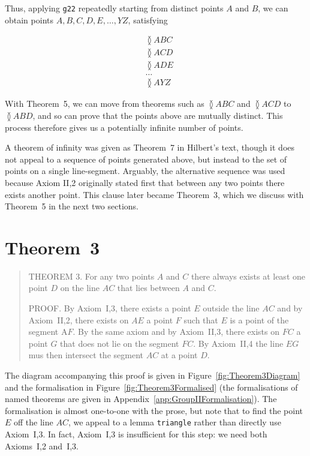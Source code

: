Thus, applying \texttt{g22} repeatedly starting from distinct points $A$ and $B$, we can obtain points $A, B, C, D, E, \ldots, Y Z$, satisfying 

\begin{align*}
&\between{A}{B}{C}\\
&\between{A}{C}{D}\\
&\between{A}{D}{E}\\
&\ldots\\
&\between{A}{Y}{Z}
\end{align*}

With Theorem~5, we can move from theorems such as $\between{A}{B}{C}$ and $\between{A}{C}{D}$ to $\between{A}{B}{D}$, and so can prove that the points above are mutually distinct. This process therefore gives us a potentially infinite number of points.

A theorem of infinity was given as Theorem~7 in Hilbert's text, though it does not appeal to a sequence of points generated above, but instead to the set of points on a single line-segment. Arguably, the alternative sequence was used because Axiom II,2 originally stated first that between any two points there exists another point. This clause later became Theorem~3, which we discuss with Theorem~5 in the next two sections.

\section{Theorem~3}\label{sec:Theorem3}
\begin{quote}
  THEOREM 3. For any two points $A$ and $C$ there always exists at least one point $D$ on the line $AC$ that lies between $A$ and $C$.

  PROOF. By Axiom~I,3, there exists a point $E$ outside the line $AC$ and by Axiom~II,2, there exists on $AE$ a point $F$ such that $E$ is a point of the segment A$F$. By the same axiom and by Axiom~II,3, there exists on $FC$ a point $G$ that does not lie on the segment $FC$. By Axiom~II,4 the line $EG$ mus then intersect the segment $AC$ at a point $D$.
\end{quote}

The diagram accompanying this proof is given in Figure~\ref{fig:Theorem3Diagram} and the formalisation in Figure~\ref{fig:Theorem3Formalised} (the formalisations of named theorems are given in Appendix~\ref{app:GroupIIFormalisation}). The formalisation is almost one-to-one with the prose, but note that to find the point $E$ off the line $AC$, we appeal to a lemma \texttt{triangle} rather than directly use Axiom~I,3. In fact, Axiom~I,3 is insufficient for this step: we need both Axioms~I,2 and~I,3.

